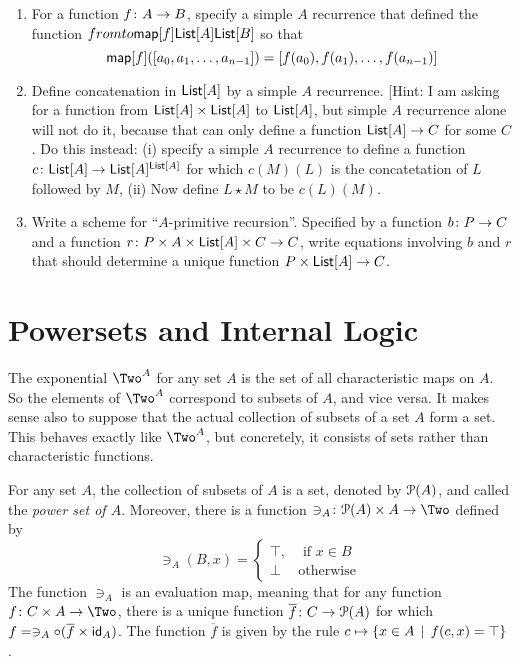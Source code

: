 \begin{exercises}
	\begin{enumerate}
		\item For a function ${f}\colon{A}\to{B}$, specify a simple $A$ recurrence that defined the function
			$fromto {\mathord{\textsf{map}}[f]}{\mathord{\textsf{List}}[A]}{\mathord{\textsf{List}}[B]}$ so that \[\mathord{\textsf{map}}[f]([a_0,a_1,\ldots, a_{n-1}]) = [f(a_0),f(a_1),\ldots, f(a_{n-1})]\]
		\item Define concatenation in $\mathord{\textsf{List}}[A]$ by a simple $A$ recurrence. [Hint: I am asking for a function from $\mathord{\textsf{List}}[A]\times \mathord{\textsf{List}}[A]$ to $\mathord{\textsf{List}}[A]$, but simple $A$ recurrence alone will not do it, because that can only define a function $\mathord{\textsf{List}}[A]\to C$ for some  $C$. Do this instead: (i) specify a simple $A$ recurrence to define a function ${c}\colon{\mathord{\textsf{List}}[A]}\to{\mathord{\textsf{List}}[A]^{\mathord{\textsf{List}}[A]}}$ for which $c(M)(L)$ is the concatetation of $L$ followed by $M$, (ii) Now define $L\star M$ to be $c(L)(M)$.
		\item Write a scheme for ``$A$-primitive recursion''. Specified by a function ${b}\colon{P}\to{C}$ and a function ${r}\colon{P\times A\times \mathord{\textsf{List}}[A] \times C}\to{C}$,
		write equations involving $b$ and $r$ that should determine a unique function $P\times \mathord{\textsf{List}}[A]\to C$. 
	\end{enumerate}
\end{exercises}

\chapter{Powersets and Internal Logic}

The exponential $\Two^A$ for any set $A$ is the set of all characteristic maps on $A$.
So the elements of $\Two^A$ correspond to subsets of $A$, and vice versa.
It makes sense also to suppose that the actual collection of subsets of a set $A$ form a set.
This behaves exactly like $\Two^A$, but concretely, it consists of sets rather than characteristic functions.

\begin{principle}\label{ax:powerset}
	For any set $A$, the collection of subsets of $A$ is a set, denoted by ${\mathcal{P}}(A)$, and called the \emph{power set of $A$}. Moreover, there is a function $\fromto {\ni_A}{\powerset(A)\times A}\Two$ defined by 
	\[\ni_A(B,x) = \begin{cases}
	\top, &\text{ if } x\in B\\
	\bot &\text{otherwise}
	\end{cases}
	\]
	The function $\ni_A$ is an evaluation map, meaning that 
	for any function $\fromto f{C\times A}\Two$, there is a unique function ${\overline{f}}\colon{C}\to{{\mathcal{P}}(A)}$ for which $f = \ni_A\circ (\overline{f} \times \textsf{id}_A)$. The function $\overline f$ 
	is given by the rule $c\mapsto \{x\in A\,\mid\, f(c,x)=\top\}$.
\end{principle}

